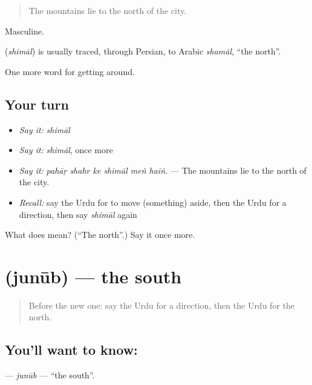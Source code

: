 \begin{quote}
The mountains lie to the north of the city.
\end{quote}

Masculine.

\begin{cousinweb}
\textbf{} (\emph{shimāl}) is usually traced, through Persian, to Arabic \emph{shamāl}, \textquotedblleft{}the north\textquotedblright{}.
\end{cousinweb}

\begin{grammarlens}[title={What you've built}]
One more word for getting around.
\end{grammarlens}

\subsection*{Your turn}
\begin{itemize}
\raggedright
  \item \emph{Say it:} \emph{shimāl}
  \item \emph{Say it:} \emph{shimāl}, once more
  \item \emph{Say it:} \emph{pahāṛ shahr ke shimāl meṅ haiṅ.} — The mountains lie to the north of the city.
  \item \emph{Recall:} say the Urdu for to move (something) aside, then the Urdu for a direction, then say \emph{shimāl} again
\end{itemize}

\begin{tcolorbox}[breakable,colback=teal!4,colframe=teal!35!black,title={Before you move on}]
What does  mean? (\textquotedblleft{}The north\textquotedblright{}.) Say it once more.
\end{tcolorbox}
\section[\texorpdfstring{\ur{جنوب} (junūb)}{جنوب (junūb)}]{ (junūb) — the south}

\label{lesson:UR-C408-junub}



\begin{quote}
Before the new one: say the Urdu for a direction, then the Urdu for the north.
\end{quote}

\subsection*{You'll want to know: }
\textbf{} — \emph{junūb} — \textquotedblleft{}the south\textquotedblright{}.

